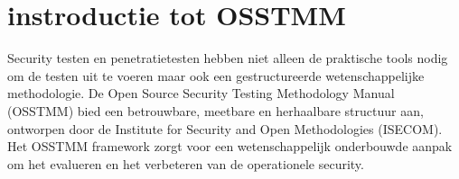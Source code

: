 

\section{instroductie tot OSSTMM}

Security testen en penetratietesten hebben niet alleen de praktische tools nodig om de testen uit te voeren maar ook een gestructureerde wetenschappelijke methodologie.
De Open Source Security Testing Methodology Manual (OSSTMM) bied een betrouwbare, meetbare en herhaalbare structuur aan, ontworpen door de Institute for Security and Open Methodologies (ISECOM).
Het OSSTMM framework zorgt voor een wetenschappelijk onderbouwde aanpak om het evalueren en het verbeteren van de operationele security.

